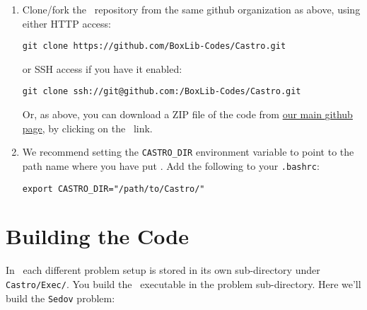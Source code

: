 \begin{enumerate}
\item Clone/fork the \castro\ repository from the same {\sf
  github} organization as above, using either HTTP access:
\begin{verbatim}
git clone https://github.com/BoxLib-Codes/Castro.git
\end{verbatim}
or SSH access if you have it enabled:
\begin{verbatim}
git clone ssh://git@github.com:/BoxLib-Codes/Castro.git
\end{verbatim}
Or, as above, you can download a ZIP file of the code from
\href{https://github.com/BoxLib-Codes}{our main {\sf github} page},
by clicking on the \castro\ link.

\item We recommend setting the {\tt CASTRO\_DIR} environment
  variable to point to the path name where you have put \castro.
  Add the following to your {\tt .bashrc}:
\begin{verbatim}
export CASTRO_DIR="/path/to/Castro/"
\end{verbatim}

\end{enumerate}


\section{Building the Code}

In \castro\ each different problem setup is stored in its own
sub-directory under {\tt Castro/Exec/}.  You build the
\castro\ executable in the problem sub-directory.  Here we'll
build the {\tt Sedov} problem:

